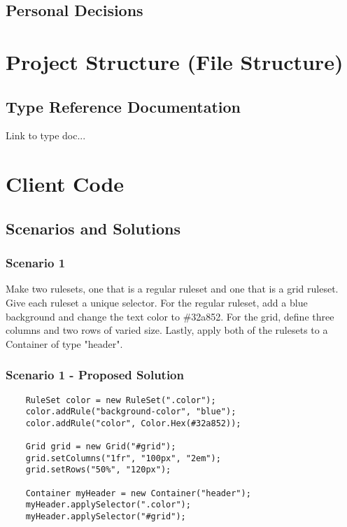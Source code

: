 \documentclass[12pt]{article}
\begin{document}
\subsection{Personal Decisions}

\section{Project Structure (File Structure)}

\subsection{Type Reference Documentation}
Link to type doc...

\section{Client Code}

\subsection{Scenarios and Solutions}

\subsubsection{Scenario 1}
Make two rulesets, one that is a regular ruleset and one that is a grid ruleset. Give each ruleset a unique selector. For the regular ruleset, add a blue background and change the text color to \#32a852. For the grid, define three columns and two rows of varied size. Lastly, apply both of the rulesets to a Container of type "header".

\subsubsection{Scenario 1 - Proposed Solution}

\begin{lstlisting}
    RuleSet color = new RuleSet(".color");
    color.addRule("background-color", "blue");
    color.addRule("color", Color.Hex(#32a852));

    Grid grid = new Grid("#grid");
    grid.setColumns("1fr", "100px", "2em");
    grid.setRows("50%", "120px");

    Container myHeader = new Container("header");
    myHeader.applySelector(".color");
    myHeader.applySelector("#grid");
\end{lstlisting}
\end{document}
